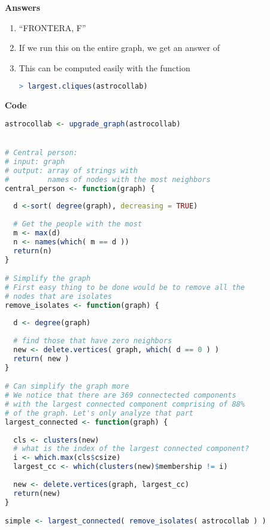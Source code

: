 \documentclass{article}
\begin{document}
\textbf{Answers}
\begin{enumerate}
	\item ``FRONTERA, F''
	
	\item If we run this on the entire graph, we get an answer of\\
	\indent {}
	
	\item This can be computed easily with the function
	\begin{lstlisting}[language =R]
> largest.cliques(astrocollab)
	\end{lstlisting}
\end{enumerate}



\textbf{Code}
\begin{lstlisting}[language = R]
astrocollab <- upgrade_graph(astrocollab)


# Central person:
# input: graph
# output: array of strings with 
#         names of nodes with the most neighbors
central_person <- function(graph) {
  
  d <-sort( degree(graph), decreasing = TRUE)
  
  # Get the people with the most
  m <- max(d)
  n <- names(which( m == d ))
  return(n)
}

# Simplify the graph
# First easy thing to be done would be to remove all the
# nodes that are isolates
remove_isolates <- function(graph) {
  
  d <- degree(graph)
  
  # find those that have zero neighbors
  new <- delete.vertices( graph, which( d == 0 ) )
  return( new )
}

# Can simplify the graph more
# We notice that there are 369 connectected components
# with the largest connected component comprising of 88%
# of the graph. Let's only analyze that part
largest_connected <- function(graph) {
  
  cls <- clusters(new)
  # what is the index of the largest connected component?
  i <- which.max(cls$csize)
  largest_cc <- which(clusters(new)$membership != i)
  
  new <- delete.vertices(graph, largest_cc)
  return(new)
}

simple <- largest_connected( remove_isolates( astrocollab ) )
\end{lstlisting}
\end{document}
